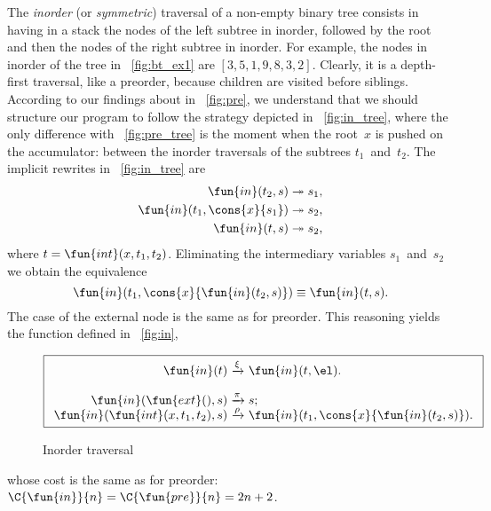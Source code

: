 The \emph{inorder} (or \emph{symmetric}) traversal of a non\hyp{}empty
binary tree consists in having in a stack the nodes of the left
subtree in inorder, followed by the root and then the nodes of the
right subtree in inorder. For example, the nodes in inorder of the
tree in \fig~\vref{fig:bt_ex1} are \([3,5,1,9,8,3,2]\). Clearly, it is
a depth\hyp{}first traversal,
like a preorder, because children are visited before siblings.
According to our findings about  in
\fig~\vref{fig:pre}, we understand that we should structure our
program to follow the strategy depicted in \fig~\vref{fig:in_tree},
where the only difference with \fig~\ref{fig:pre_tree} is the moment
when the root~\(x\) is pushed on the accumulator: between the inorder traversals of the
subtrees \(t_1\)~and~\(t_2\). The implicit rewrites in
\fig~\ref{fig:in_tree} are
\begin{align*}
  \fun{in}(t_2,s) &\twoheadrightarrow s_1,\index{in@\fun{in/2}}\\
  \fun{in}(t_1,\cons{x}{s_1}) &\twoheadrightarrow s_2,\\
  \fun{in}(t,s) &\twoheadrightarrow s_2,
\end{align*}
where \(t=\fun{int}(x,t_1,t_2)\). Eliminating the intermediary
variables \(s_1\)~and~\(s_2\) we obtain the equivalence
\begin{equation*}
  \fun{in}(t_1,\cons{x}{\fun{in}(t_2,s)}) \equiv \fun{in}(t,s).
\end{equation*}
The case of the external node is the same as for preorder. This
reasoning yields the function defined in \fig~\vref{fig:in},
\begin{figure}[t]
\begin{equation*}
\boxed{
\begin{array}{r@{\;}c@{\;}l}
\fun{in}(t) & \xrightarrow{\xi} & \fun{in}(t,\el).\\
\\
\fun{in}(\fun{ext}(),s) & \xrightarrow{\smash{\pi}} & s;\\
\fun{in}(\fun{int}(x,t_1,t_2),s)
  & \xrightarrow{\smash{\rho}}
  & \fun{in}(t_1,\cons{x}{\fun{in}(t_2,s)}).
\end{array}}
\end{equation*}
\caption{Inorder traversal}
\label{fig:in}
\end{figure}
whose cost is the same as for preorder: \(\C{\fun{in}}{n} =
\C{\fun{pre}}{n} = 2n + 2\).

